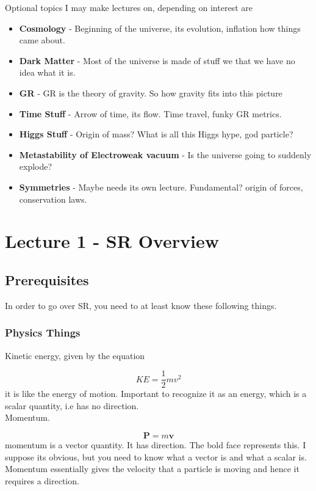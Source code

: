 Optional topics I may make lectures on, depending on interest are 

\begin{itemize}
  \item \textbf{Cosmology} - Beginning of the universe, its evolution, inflation how things came about. 
  \item \textbf{Dark Matter} - Most of the universe is made of stuff we that we have no idea what it is. 
  \item \textbf{GR} - GR is the theory of gravity. So how gravity fits into this picture
  \item \textbf{Time Stuff} - Arrow of time, its flow. Time travel, funky GR metrics. 
  \item \textbf{Higgs Stuff} - Origin of mass? What is all this Higgs hype, god particle?
  \item \textbf{Metastability of Electroweak vacuum} - Is the universe going to suddenly explode?
  \item \textbf{Symmetries} - Maybe needs its own lecture. Fundamental? origin of forces, conservation laws. 
\end{itemize}


\section{Lecture 1 - SR Overview}

\subsection{Prerequisites}

In order to go over SR, you need to at least know these following things. 

\subsubsection{Physics Things}
Kinetic energy, given by the equation

\begin{equation}
KE = \frac{1}{2} m v^2
\end{equation}
it is like the energy of motion. Important to recognize it as an energy, which is a scalar quantity, i.e has no direction. \\

Momentum. 

\begin{equation}
  \mathbf{P} = m \mathbf{v}
\end{equation}
momentum is a vector quantity. It has direction. The bold face represents this. I suppose its obvious, but you need to know what a vector is and what a scalar is. Momentum essentially gives the velocity that a particle is moving and hence it requires a direction. 

